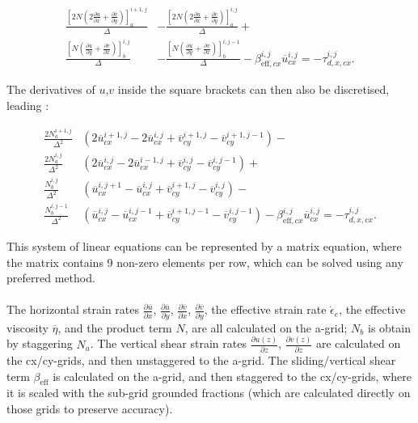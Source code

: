 \documentclass{article}
\begin{document}
\begin{equation} \label{eq:DIVA_disc_02}
\begin{split}
\frac{ { \left[ 2 N \left( 2 \frac{\partial \overline{u} }{\partial x} +
\frac{\partial \overline{v}}{\partial y} \right) \right] }_a^{i+1,j} }{\Delta} &-
\frac{ { \left[ 2 N \left( 2 \frac{\partial \overline{u} }{\partial x} +
\frac{\partial \overline{v}}{\partial y} \right) \right] }_a^{i,j} }{\Delta} + \\
\frac{ { \left[ N \left( \frac{\partial \overline{u} }{\partial y} +
\frac{\partial \overline{v}}{\partial x} \right) \right] }_b^{i,j} }{\Delta} &-
\frac{ { \left[ N \left( \frac{\partial \overline{u} }{\partial y} +
\frac{\partial \overline{v}}{\partial x} \right) \right] }_b^{i,j-1} }{\Delta}
- \beta_{\textrm{eff},cx}^{i,j} \overline{u}_{cx}^{i,j} = -\tau_{d,x,cx}^{i,j}.
\end{split}
\end{equation}

The derivatives of $u$,$v$ inside the square brackets can then also be discretised, leading :

\begin{equation} \label{eq:DIVA_disc_03}
\begin{split}
\frac{ 2 N_a^{i+1,j}}{\Delta^2} & \left( 2 \overline{u}_{cx}^{i+1,j} - 2 \overline{u}_{cx}^{i,j} +
\overline{v}_{cy}^{i+1,j} - \overline{v}_{cy}^{i+1,j-1} \right) - \\
\frac{ 2 N_a^{i,j}}{\Delta^2} & \left( 2 \overline{u}_{cx}^{i,j} - 2 \overline{u}_{cx}^{i-1,j} +
\overline{v}_{cy}^{i,j} - \overline{v}_{cy}^{i,j-1} \right) + \\
\frac{ N_b^{i,j}}{\Delta^2} & \left( \overline{u}_{cx}^{i,j+1} - \overline{u}_{cx}^{i,j} +
\overline{v}_{cy}^{i+1,j} - \overline{v}_{cy}^{i,j} \right) - \\
\frac{ N_b^{i,j-1}}{\Delta^2} & \left( \overline{u}_{cx}^{i,j} - \overline{u}_{cx}^{i,j-1} +
\overline{v}_{cy}^{i+1,j-1} - \overline{v}_{cy}^{i,j-1} \right)
- \beta_{\textrm{eff},cx}^{i,j} \overline{u}_{cx}^{i,j} = -\tau_{d,x,cx}^{i,j}.
\end{split}
\end{equation}

This system of linear equations can be represented by a matrix equation, where the matrix contains 9 non-zero elements per row, which can be solved using any preferred method.\\
\\
The horizontal strain rates $\frac{\partial \overline{u}}{\partial x}$, $\frac{\partial \overline{u}}{\partial y}$, $\frac{\partial \overline{v}}{\partial x}$, $\frac{\partial \overline{v}}{\partial y}$, the effective strain rate $\dot{\epsilon}_e$, the effective viscosity $\overline{\eta}$, and the product term $N$, are all calculated on the a-grid; $N_b$ is obtain by staggering $N_a$. The vertical shear strain rates $\frac{\partial u(z)}{\partial z}$, $\frac{\partial v(z)}{\partial z}$ are calculated on the cx/cy-grids, and then unstaggered to the a-grid. The sliding/vertical shear term $\beta_{\textrm{eff}}$ is calculated on the a-grid, and then staggered to the cx/cy-grids, where it is scaled with the sub-grid grounded fractions (which are calculated directly on those grids to preserve accuracy).
\end{document}
